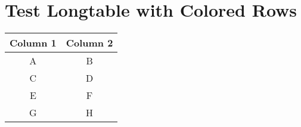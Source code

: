 \documentclass{article}
\begin{document}
\section*{Test Longtable with Colored Rows}

\begin{longtable}{|c|c|}
\hline
\rowcolor{headerblue} \textbf{Column 1} & \textbf{Column 2} \\
\hline
\endhead
\rowcolor{lightblue} A & B \\
\hline
C & D \\
\hline
\rowcolor{lightblue} E & F \\
\hline
G & H \\
\hline
\end{longtable}
\end{document}
